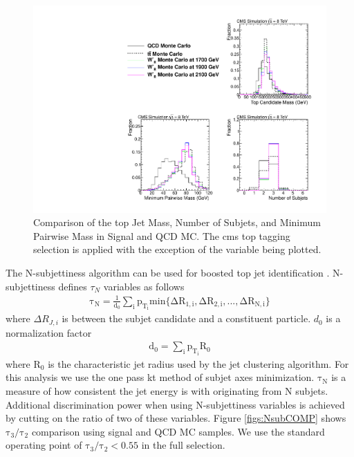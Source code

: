\begin{figure}[htb]
\centering
\includegraphics[width=1.0\textwidth]{AN-13-004/figs/CutCompqcdandsignal}
\caption{Comparison of the top Jet Mass, Number of Subjets, and Minimum Pairwise Mass in Signal and QCD MC.  The cms top tagging selection is applied 
with the exception of the variable being plotted.}
\label{figs:CutCompP}
\end{figure}

The N-subjettiness algorithm can be used for boosted top jet identification \cite{Thaler:2011gf}.  N-subjettiness defines $\tau_N$ variables as follows 
\begin{eqnarray}
	\mathrm{\tau_{N} = \frac{1}{d_0}\sum_{i}p_{T_i}min\{\Delta R_{1,i},\Delta R_{2,i},...,\Delta R_{N,i}\}}
\end{eqnarray}
where $\Delta R_{J,i}$ is between the subjet candidate and a constituent particle.  $d_0$ is a normalization factor 
\begin{eqnarray}
	\mathrm{d_0 = \sum_i p_{T_i} R_0}
\end{eqnarray}
where $\mathrm{R_0}$ is the characteristic jet radius used by the jet clustering algorithm.  For this analysis we use the one pass kt method of subjet axes minimization.  $\mathrm{\tau_N}$ is a measure of how consistent the jet energy is with originating from N subjets. 
Additional discrimination power when using N-subjettiness variables is achieved by cutting on the ratio of two of these variables.   
Figure \ref{figs:NsubCOMP} shows $\mathrm{\tau_3/\tau_2}$ comparison using signal and QCD MC samples.  We use the standard operating point of $\mathrm{\tau_3/\tau_2} < 0.55$  \cite{JME13007} in the full selection.

